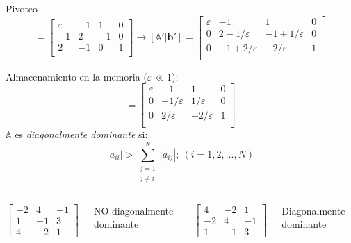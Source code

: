 \documentclass[9pt, aspectratio=169]{beamer}
\begin{document}
\begin{frame}{Pivoteo}
	\begin{equation*} [\mathbb{A} | \mathbf{b}] =
		\left[
			\begin{array}{ccc|c}
				\varepsilon & -1 & 1  & 0 \\
				-1          & 2  & -1 & 0 \\
				2           & -1 & 0  & 1 \\
			\end{array} \right]
		\rightarrow [\mathbb{A'} | \mathbf{b'}] =
		\left[
			\begin{array}{ccc|c}
				\varepsilon & -1               & 1                & 0 \\
				0           & 2-1/\varepsilon  & -1+1/\varepsilon & 0 \\
				0           & -1+2/\varepsilon & -2/\varepsilon   & 1 \\
			\end{array} \right]
	\end{equation*} \pause

	Almacenamiento en la memoria ($\varepsilon \ll 1$):
	\begin{equation*}
		[\mathbb{A'} | \mathbf{b'}] =
		\left[
			\begin{array}{ccc|c}
				\varepsilon & -1             & 1              & 0 \\
				0           & -1/\varepsilon & 1/\varepsilon  & 0 \\
				0           & 2/\varepsilon  & -2/\varepsilon & 1 \\
			\end{array} \right]
	\end{equation*} \pause
	$\mathbb{A}$ es \textit{diagonalmente dominante} si:
	\[ |a_{ii}| > \sum_{\substack{j=1 \\j \neq i}}^N |a_{ij}|; \> (i = 1, 2, \ldots, N)  \]
	\vspace{-0.1cm}
	\begin{columns}
		\column{5cm}
		\begin{equation*}
			\left[ \begin{array}{ccc}
					-2 & 4  & -1 \\
					1  & -1 & 3  \\
					4  & -2 & 1
				\end{array} \right]
		\end{equation*}
		\begin{center}
			{\small NO diagonalmente dominante}
		\end{center}
		\column{5cm}
		\begin{equation*}
			\left[ \begin{array}{ccc}
					4  & -2 & 1  \\
					-2 & 4  & -1 \\
					1  & -1 & 3
				\end{array} \right]
		\end{equation*}
		\begin{center}
			{\small Diagonalmente dominante}
		\end{center}
	\end{columns}
\end{frame}
\end{document}
